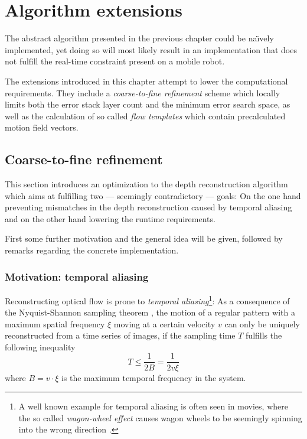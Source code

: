 \chapter{Algorithm extensions}

The abstract algorithm presented in the previous chapter could be na\"{\i}vely implemented, yet doing so will most likely result in an implementation that does not fulfill the real-time constraint present on a mobile robot.

The extensions introduced in this chapter attempt to lower the computational requirements. They include a \textit{coarse-to-fine refinement} scheme which locally limits both the error stack layer count and the minimum error search space, as well as the calculation of so called \textit{flow templates} which contain precalculated motion field vectors.

\section{Coarse-to-fine refinement}

\label{sec:coarse_to_fine}

This section introduces an optimization to the depth reconstruction algorithm which aims at fulfilling two --- seemingly contradictory --- goals: On the one hand preventing mismatches in the depth reconstruction caused by temporal aliasing and on the other hand lowering the runtime requirements.

First some further motivation and the general idea will be given, followed by remarks regarding the concrete implementation.

\subsection{Motivation: temporal aliasing}

Reconstructing optical flow is prone to \textit{temporal aliasing}\footnote{A well known example for temporal aliasing is often seen in movies, where the so called \textit{wagon-wheel effect} causes wagon wheels to be seemingly spinning into the wrong direction \citep{wiki:WagonWheel}.}: As a consequence of the Nyquist-Shannon sampling theorem \citep[see][]{wiki:samplingTheorem}, the motion of a regular pattern with a maximum spatial frequency $\xi$ moving at a certain velocity $v$ can only be uniquely reconstructed from a time series of images, if the sampling time $T$ fulfills the following inequality
\begin{equation}
  T \leq \frac{1}{2B} = \frac{1}{2 v \xi}
  \label{eqn:spatial_shannon}
\end{equation}
where $B = v \cdot \xi$ is the maximum temporal frequency in the system.

